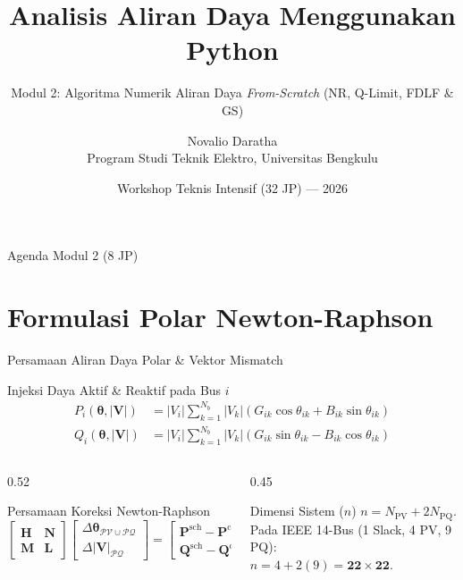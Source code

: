 \documentclass[aspectratio=169,10pt]{beamer}
\title[Aliran Daya Python — Modul 2]{Analisis Aliran Daya Menggunakan Python}
\subtitle{Modul 2: Algoritma Numerik Aliran Daya \textit{From-Scratch} (NR, Q-Limit, FDLF \& GS)}
\author[Novalio Daratha]{Novalio Daratha\\Program Studi Teknik Elektro, Universitas Bengkulu}
\date{Workshop Teknis Intensif (32 JP) — 2026}
\begin{document}
\begin{frame}
  \titlepage
\end{frame}

\begin{frame}{Agenda Modul 2 (8 JP)}
  \tableofcontents
\end{frame}

\section{Formulasi Polar Newton-Raphson}

\begin{frame}{Persamaan Aliran Daya Polar \& Vektor Mismatch}
  \begin{block}{Injeksi Daya Aktif \& Reaktif pada Bus $i$}
    \begin{align*}
      P_i(\boldsymbol{\theta}, |\mathbf{V}|) &= |V_i|\sum_{k=1}^{N_b} |V_k|\left(G_{ik}\cos\theta_{ik} + B_{ik}\sin\theta_{ik}\right) \\
      Q_i(\boldsymbol{\theta}, |\mathbf{V}|) &= |V_i|\sum_{k=1}^{N_b} |V_k|\left(G_{ik}\sin\theta_{ik} - B_{ik}\cos\theta_{ik}\right)
    \end{align*}
  \end{block}
  \begin{columns}[T]
    \begin{column}{0.52\textwidth}
      \begin{exampleblock}{Persamaan Koreksi Newton-Raphson}
        \[
          \begin{bmatrix} \mathbf{H} & \mathbf{N} \\ \mathbf{M} & \mathbf{L} \end{bmatrix}
          \begin{bmatrix} \Delta\boldsymbol{\theta}_{\mathcal{PV}\cup\mathcal{PQ}} \\ \Delta|\mathbf{V}|_{\mathcal{PQ}} \end{bmatrix}
          =
          \begin{bmatrix} \mathbf{P}^{\text{sch}} - \mathbf{P}^{\text{calc}} \\ \mathbf{Q}^{\text{sch}} - \mathbf{Q}^{\text{calc}} \end{bmatrix}
        \]
      \end{exampleblock}
    \end{column}
    \begin{column}{0.45\textwidth}
      \begin{alertblock}{Dimensi Sistem ($n$)}
        $n = N_{\text{PV}} + 2 N_{\text{PQ}}$.\\
        Pada IEEE 14-Bus (1 Slack, 4 PV, 9 PQ):\\
        $n = 4 + 2(9) = \mathbf{22 \times 22}$.
      \end{alertblock}
    \end{column}
  \end{columns}
\end{frame}
\end{document}
